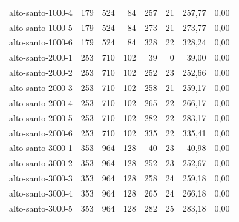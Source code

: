 \begin{table}[ht!]
{\begin{tabular}{lrrr|rr|rr}
			alto-santo-1000-4                                                                                    & 179  & 524  & 84  & 257 & 21 & 257,77 & 0,00 \\
			alto-santo-1000-5                                                                                    & 179  & 524  & 84  & 273 & 21 & 273,77 & 0,00 \\
			alto-santo-1000-6                                                                                    & 179  & 524  & 84  & 328 & 22 & 328,24 & 0,00 \\
			alto-santo-2000-1                                                                                    & 253  & 710  & 102 & 39  & 0  & 39,00  & 0,00 \\
			alto-santo-2000-2                                                                                    & 253  & 710  & 102 & 252 & 23 & 252,66 & 0,00 \\
			alto-santo-2000-3                                                                                    & 253  & 710  & 102 & 258 & 21 & 259,17 & 0,00 \\
			alto-santo-2000-4                                                                                    & 253  & 710  & 102 & 265 & 22 & 266,17 & 0,00 \\
			alto-santo-2000-5                                                                                    & 253  & 710  & 102 & 282 & 22 & 283,17 & 0,00 \\
			alto-santo-2000-6                                                                                    & 253  & 710  & 102 & 335 & 22 & 335,41 & 0,00 \\
			alto-santo-3000-1                                                                                    & 353  & 964  & 128 & 40  & 23 & 40,98  & 0,00 \\
			alto-santo-3000-2                                                                                    & 353  & 964  & 128 & 252 & 23 & 252,67 & 0,00 \\
			alto-santo-3000-3                                                                                    & 353  & 964  & 128 & 258 & 24 & 259,18 & 0,00 \\
			alto-santo-3000-4                                                                                    & 353  & 964  & 128 & 265 & 24 & 266,18 & 0,00 \\
			alto-santo-3000-5                                                                                    & 353  & 964  & 128 & 282 & 25 & 283,18 & 0,00 \\

\end{tabular}}
\end{table}
